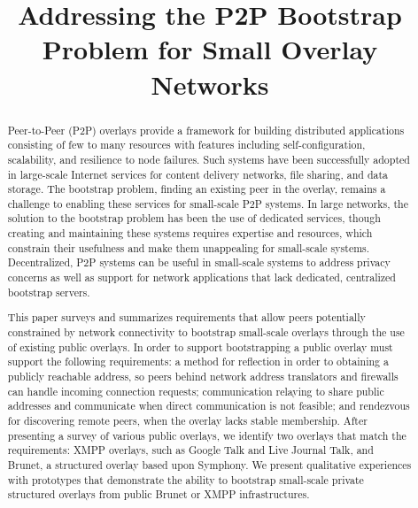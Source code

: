 \documentclass[conference]{IEEEtran}
\begin{document}
\title{Addressing the P2P Bootstrap Problem for Small Overlay Networks}

\author{
}

\maketitle

\begin{abstract}

Peer-to-Peer (P2P) overlays provide a framework for building distributed
applications consisting of few to many resources with features including
self-configuration, scalability, and resilience to node failures.  Such systems
have been successfully adopted in large-scale Internet services for content
delivery networks, file sharing, and data storage.  The bootstrap problem,
finding an existing peer in the overlay, remains a challenge to enabling these
services for small-scale P2P systems.  In large networks, the solution to the
bootstrap problem has been the use of dedicated services, though creating and
maintaining these systems requires expertise and resources, which constrain
their usefulness and make them unappealing for small-scale systems.
Decentralized, P2P systems can be useful in small-scale systems to address privacy
concerns as well as support for network applications that lack dedicated,
centralized bootstrap servers.

This paper surveys and summarizes requirements that allow peers potentially
constrained by network connectivity to bootstrap small-scale overlays through
the use of existing public overlays.  In order to support bootstrapping a
public overlay must support the following requirements: a method for reflection
in order to obtaining a publicly reachable address, so peers behind network
address translators and firewalls can handle incoming connection requests;
communication relaying to share public addresses and communicate when direct
communication is not feasible; and rendezvous for discovering remote peers,
when the overlay lacks stable membership.  After presenting a survey of various
public overlays, we identify two overlays that match the requirements:  XMPP
overlays, such as Google Talk and Live Journal Talk, and Brunet, a structured
overlay based upon Symphony.  We present qualitative experiences with
prototypes that demonstrate the ability to bootstrap small-scale private
structured overlays from public Brunet or XMPP infrastructures.

\end{abstract}
\end{document}
